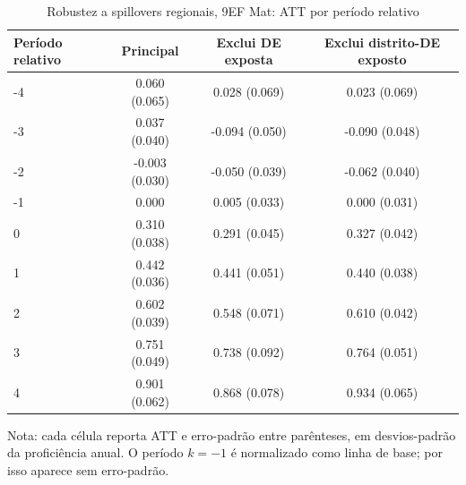 \begin{table}[!htbp]
\centering
\caption{Robustez a spillovers regionais, 9EF Mat: ATT por período relativo}
\label{tab:ap_event_spillover_9ef_mat}
\vspace{-0.15cm}
\scriptsize
\setlength{\tabcolsep}{4pt}
\renewcommand{\arraystretch}{0.92}
\begin{tabular}{lccc}
\toprule
Período relativo & Principal & Exclui DE exposta & Exclui distrito-DE exposto \\
\midrule
-4 & 0.060 (0.065) & 0.028 (0.069) & 0.023 (0.069) \\
-3 & 0.037 (0.040) & -0.094 (0.050) & -0.090 (0.048) \\
-2 & -0.003 (0.030) & -0.050 (0.039) & -0.062 (0.040) \\
-1 & 0.000 & 0.005 (0.033) & 0.000 (0.031) \\
0 & 0.310 (0.038) & 0.291 (0.045) & 0.327 (0.042) \\
1 & 0.442 (0.036) & 0.441 (0.051) & 0.440 (0.038) \\
2 & 0.602 (0.039) & 0.548 (0.071) & 0.610 (0.042) \\
3 & 0.751 (0.049) & 0.738 (0.092) & 0.764 (0.051) \\
4 & 0.901 (0.062) & 0.868 (0.078) & 0.934 (0.065) \\
\bottomrule
\end{tabular}
\begin{flushleft}
\footnotesize Nota: cada célula reporta ATT e erro-padrão entre parênteses, em desvios-padrão da proficiência anual. O período \(k=-1\) é normalizado como linha de base; por isso aparece sem erro-padrão.
\end{flushleft}
\end{table}
